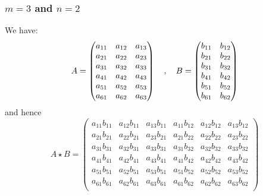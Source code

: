 \documentclass[10pt]{amsart}
\theoremstyle{definition}
\theoremstyle{remark}
\numberwithin{equation}{section}
\newcommand{\0}{\color{blue}{\mathsf{0}}}
\begin{document}
\subsubsection{ $m=3$ and $n=2$}We have:
\[ A= \begin{pmatrix}
a_{11}   &   a_{12}   & a_{13}    \\ 
a_{21}   &   a_{22}    & a_{23}  \\
a_{31}  &   a_{32}      &a_{33} \\
a_{41}   &   a_{42} & a_{43} \\
a_{51}   &   a_{52} & a_{53} \\
a_{61}   &   a_{62} & a_{63}     
\end{pmatrix} 
\\  \quad , \quad B= \begin{pmatrix}
b_{11}  &    b_{12}    \\ 
b_{21}  &    b_{22}     \\
b_{31}  &     b_{32}    \\
b_{41}  &     b_{42}    \\
b_{51}  &     b_{52}    \\
b_{61}  &     b_{62}    
\end{pmatrix} 
\]
and hence
\[ A\star B = 
\begin{pmatrix}
a_{11}b_{11}  &   a_{12} b_{11}    & a_{13} b_{11}   & a_{11}b_{12}  &   a_{12} b_{12} &  a_{13} b_{12}  \\ 
a_{21}b_{21}  &   a_{22} b_{21}   & a_{23} b_{21}  & a_{21}b_{22}  &   a_{22} b_{22}   &  a_{23} b_{22}  \\
a_{31}b_{31}  &   a_{32} b_{31}   & a_{33} b_{31}  & a_{31}b_{32}  &   a_{32} b_{32} &   a_{33} b_{32}   \\
a_{41}b_{41}  &   a_{42} b_{41}    & a_{43} b_{41} & a_{41}b_{42}  &   a_{42} b_{42}  & a_{43} b_{42}   \\
a_{51}b_{51}  &   a_{52} b_{51}    & a_{53} b_{51} & a_{51}b_{52}  &   a_{52} b_{52}  & a_{53} b_{52}   \\
a_{61}b_{61}  &   a_{62} b_{61}    & a_{63} b_{61} & a_{61}b_{62}  &   a_{62} b_{62}  & a_{63} b_{62}   \\
\end{pmatrix} 
 \]
\end{document}
